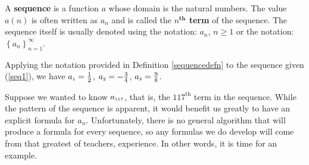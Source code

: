 \documentclass{ximera}
\begin{document}
\colorbox{ResultColor}{\bbm

\begin{defn} \label{sequencedefn}   A \textbf{sequence} is a function $a$ whose domain is the natural numbers. The value $a(n)$ is often written as $a_{n}$ and is called the   \textbf{\boldmath $n^{\textbf{th}}$ term} of the sequence.  The sequence itself is usually denoted using the notation:  $a_{n}$, $n \geq 1$ or the notation:  $\left\{ a_{n} \right\}_{n = 1}^{\infty}$.


\end{defn}

\ebm}

\smallskip

Applying the notation provided in Definition \ref{sequencedefn} to the sequence given (\ref{seq1}), we have $a_{\text{\tiny$1$}} =  \frac{1}{2}$, $a_{\text{\tiny$2$}} =  -\frac{3}{4}$, $a_{\text{\tiny$3$}} =  \frac{9}{8}$. 

Suppose we wanted to know $a_{\text{\tiny$117$}}$, that is, the $117^{\text{th}}$ term in the sequence. While the pattern of the sequence is apparent, it would benefit us greatly to have an explicit formula for $a_{n}$.  Unfortunately, there is no general algorithm that will produce a formula for every sequence, so any formulas we do  develop will come from that greatest of teachers, experience. In other words, it is time for an example.
\end{document}
